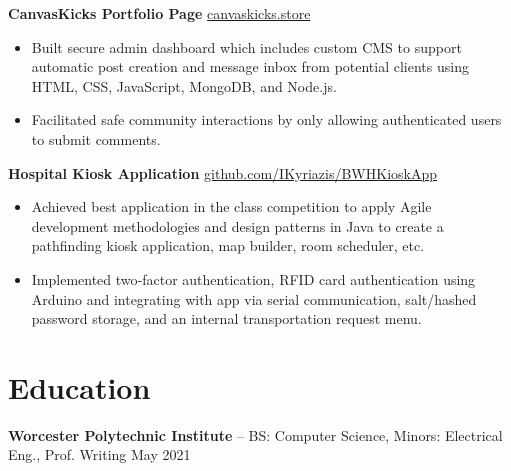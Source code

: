 \documentclass[11pt]{article}       %
\begin{document}
\textbf{CanvasKicks Portfolio Page} \hfill \href{https://canvaskicks.store/prevWorks.html}{canvaskicks.store} \\
\vspace{-9pt}
\begin{itemize}
  \item Built secure admin dashboard which includes custom CMS to support automatic post creation and message inbox from potential clients using HTML, CSS, JavaScript, MongoDB, and Node.js.
  \item Facilitated safe community interactions by only allowing authenticated users to submit comments.
\end{itemize}

\textbf{Hospital Kiosk Application} \hfill \href{https://github.com/IKyriazis/BWHKioskApp/commits?author=IKyriazis}{github.com/IKyriazis/BWHKioskApp} \\
\vspace{-9pt}
\begin{itemize}
  \item Achieved best application in the class competition to apply Agile development methodologies and design patterns in Java to create a pathfinding kiosk application, map builder, room scheduler, etc.
  \item Implemented two‐factor authentication, RFID card authentication using Arduino and integrating with app via serial communication, salt/hashed password storage, and an internal transportation request menu.
\end{itemize}


\vspace{-18.5pt}

\section*{Education}
\textbf{Worcester Polytechnic Institute} -- BS: Computer Science, Minors: Electrical Eng., Prof. Writing \hfill May 2021
\end{document}
